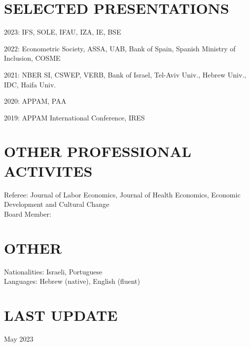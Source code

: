 \documentclass[margin]{res} %
\begin{document}
\begin{resume}
\section{SELECTED PRESENTATIONS} 
\vspace{2em}

 2023: IFS, SOLE, IFAU, IZA, IE, BSE

 2022: Econometric Society, ASSA, UAB, Bank of Spain, Spanish Ministry of Inclusion, COSME

 2021: NBER SI, CSWEP, VERB, Bank of Israel, Tel-Aviv Univ., Hebrew Univ., IDC, Haifa Univ.

 2020: APPAM, PAA

 2019: APPAM International Conference, IRES

\section{OTHER PROFESSIONAL ACTIVITES} 

Referee: Journal of Labor Economics, Journal of Health Economics, Economic Development and Cultural Change
\\
Board Member: 
\section{OTHER} 
Nationalities: Israeli, Portuguese \\
Languages: Hebrew (native), English (fluent) \\

\section{LAST UPDATE} 
May 2023

\end{resume}
\end{document}
